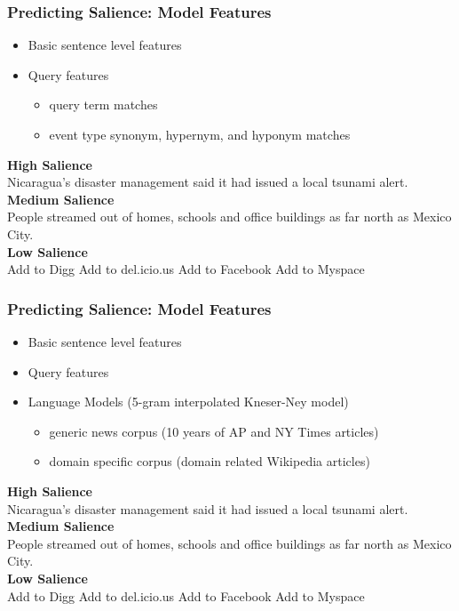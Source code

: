 \documentclass{beamer}
\begin{document}
\begin{frame}
\frametitle{Predicting Salience: Model Features}
\begin{itemize}
\item Basic sentence level features
\item Query features
\begin{itemize}
\item query term matches
\item event type synonym, \alert<2>{hypernym}, and hyponym matches
\end{itemize}
\end{itemize}

\textbf{High Salience}\\ 
Nicaragua's \alert<2>{disaster} management said it had issued a local tsunami alert.\\
\textbf{Medium Salience} \\
People streamed out of homes, schools and office buildings as far north as 
Mexico City.\\

\textbf{Low Salience} \\
Add to Digg Add to del.icio.us Add to Facebook Add to Myspace

\end{frame}


\begin{frame}
\frametitle{Predicting Salience: Model Features}
\begin{itemize}
\item Basic sentence level features
\item Query features
\item Language Models (5-gram interpolated Kneser-Ney model)
\begin{itemize}
\item \alert<2>{generic news corpus (10 years of AP and NY Times articles)}
\item \alert<4>{domain specific corpus (domain related Wikipedia articles)}
\end{itemize}
\end{itemize}

\pause
\textbf{High Salience}\\ 
\alert<2,4>{Nicaragua's disaster management said it had issued a local tsunami alert.}\\
\textbf{Medium Salience} \\
\alert<2>{People streamed out of homes, schools and office buildings as far north as Mexico City.}\\
\textbf{Low Salience} \\
Add to Digg Add to del.icio.us Add to Facebook Add to Myspace 


\end{frame}
\end{document}

